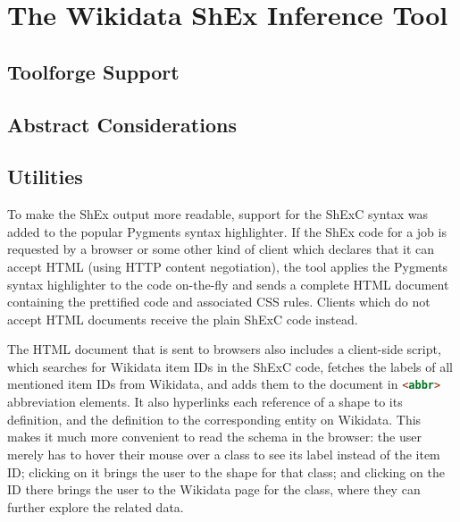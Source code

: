 \chapter{The Wikidata ShEx Inference Tool}
\label{ch:wdsi}

\section{Toolforge Support}
\label{sec:wdsi:Toolforge}

\section{Abstract Considerations}
\label{sec:wdsi:abstract}

\section{Utilities}
\label{sec:wdsi:utilities}

To make the ShEx output more readable,
support for the ShExC syntax was added to the popular Pygments syntax highlighter. %
If the ShEx code for a job %
is requested by a browser
or some other kind of client which declares that it can accept HTML
(using HTTP content negotiation),
the tool applies the Pygments syntax highlighter to the code on-the-fly
and sends a complete HTML document containing the prettified code and associated CSS rules.
Clients which do not accept HTML documents receive the plain ShExC code instead.

The HTML document that is sent to browsers
also includes a client-side script,
which searches for Wikidata item IDs in the ShExC code,
fetches the labels of all mentioned item IDs from Wikidata,
and adds them to the document in \lstinline[language=html]{<abbr>} abbreviation elements.
It also hyperlinks each reference of a shape to its definition,
and the definition to the corresponding entity on Wikidata.
This makes it much more convenient to read the schema in the browser:
the user merely has to hover their mouse over a class to see its label instead of the item ID;
clicking on it brings the user to the shape for that class;
and clicking on the ID there brings the user to the Wikidata page for the class,
where they can further explore the related data.

